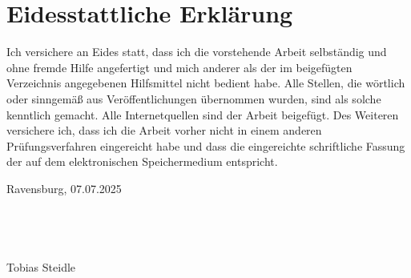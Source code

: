 \documentclass[12pt, ngerman, a4paper, numbers=noenddot]{article}
\begin{document}


\newpage
\hypersetup{pageanchor=true}
\renewcommand{\thepage}{\Roman{page}}


\newpage
\section*{Eidesstattliche Erklärung}
Ich versichere an Eides statt, dass ich die vorstehende Arbeit selbständig und ohne fremde Hilfe angefertigt und mich anderer als der im beigefügten Verzeichnis angegebenen Hilfsmittel nicht bedient habe. Alle Stellen, die wörtlich oder sinngemäß aus Veröffentlichungen übernommen wurden, sind als solche kenntlich gemacht. Alle Internetquellen sind der Arbeit beigefügt. Des Weiteren versichere ich, dass ich die Arbeit vorher nicht in einem anderen Prüfungsverfahren eingereicht habe und dass die eingereichte schriftliche Fassung der auf dem elektronischen Speichermedium entspricht.\\
\begin{flushleft}
	Ravensburg, 07.07.2025
	\ \\
	\ \\
	\ \\
	\ \\
	\ \\
	Tobias Steidle
\end{flushleft}

\newpage
\tableofcontents{}

%
%
%
%
%
%
%
%
%
\end{document}
